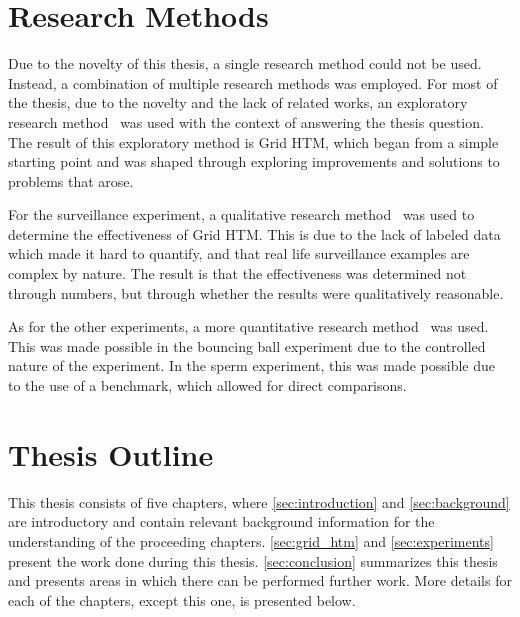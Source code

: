 \section{Research Methods}
Due to the novelty of this thesis, a single research method could not be used. Instead, a combination of multiple research methods was employed. For most of the thesis, due to the novelty and the lack of related works, an exploratory research method~\cite{exploratory_research} was used with the context of answering the thesis question. The result of this exploratory method is Grid HTM, which began from a simple starting point and was shaped through exploring improvements and solutions to problems that arose.
\par
For the surveillance experiment, a qualitative research method~\cite{quantitative_qualitative} was used to determine the effectiveness of Grid HTM. This is due to the lack of labeled data which made it hard to quantify, and that real life surveillance examples are complex by nature. The result is that the effectiveness was determined not through numbers, but through whether the results were qualitatively reasonable.
\par
As for the other experiments, a more quantitative research method~\cite{quantitative_qualitative} was used. This was made possible in the bouncing ball experiment due to the controlled nature of the experiment. In the sperm experiment, this was made possible due to the use of a benchmark, which allowed for direct comparisons.
\section{Thesis Outline}
This thesis consists of five chapters, where \autoref{sec:introduction} and \autoref{sec:background} are introductory and contain relevant background information for the understanding of the proceeding chapters. \autoref{sec:grid_htm} and \autoref{sec:experiments} present the work done during this thesis. \autoref{sec:conclusion} summarizes this thesis and presents areas in which there can be performed further work. More details for each of the chapters, except this one, is presented below.
\par
